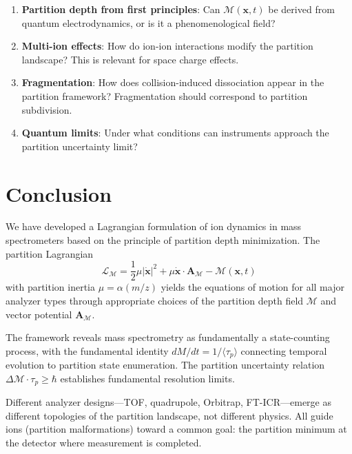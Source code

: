 \documentclass[twocolumn,10pt,a4paper]{article}
\theoremstyle{definition}
\theoremstyle{remark}
\newcommand{\Mdepth}{\mathcal{M}}
\newcommand{\Lagr}{\mathcal{L}}
\newcommand{\Apartition}{\mathbf{A}_{\mathcal{M}}}
\newcommand{\partinert}{\mu}
\newcommand{\taup}{\tau_p}
\begin{document}
\begin{enumerate}
    \item \textbf{Partition depth from first principles}: Can $\Mdepth(\mathbf{x}, t)$ be derived from quantum electrodynamics, or is it a phenomenological field?

    \item \textbf{Multi-ion effects}: How do ion-ion interactions modify the partition landscape? This is relevant for space charge effects.

    \item \textbf{Fragmentation}: How does collision-induced dissociation appear in the partition framework? Fragmentation should correspond to partition subdivision.

    \item \textbf{Quantum limits}: Under what conditions can instruments approach the partition uncertainty limit?
\end{enumerate}

\section{Conclusion}
\label{sec:conclusion}

We have developed a Lagrangian formulation of ion dynamics in mass spectrometers based on the principle of partition depth minimization. The partition Lagrangian
\begin{equation*}
    \Lagr_{\Mdepth} = \frac{1}{2}\partinert|\dot{\mathbf{x}}|^2 + \partinert\dot{\mathbf{x}}\cdot\Apartition - \Mdepth(\mathbf{x}, t)
\end{equation*}
with partition inertia $\partinert = \alpha(m/z)$ yields the equations of motion for all major analyzer types through appropriate choices of the partition depth field $\Mdepth$ and vector potential $\Apartition$.

The framework reveals mass spectrometry as fundamentally a state-counting process, with the fundamental identity $dM/dt = 1/\langle\taup\rangle$ connecting temporal evolution to partition state enumeration. The partition uncertainty relation $\Delta\Mdepth \cdot \taup \geq \hbar$ establishes fundamental resolution limits.

Different analyzer designs---TOF, quadrupole, Orbitrap, FT-ICR---emerge as different topologies of the partition landscape, not different physics. All guide ions (partition malformations) toward a common goal: the partition minimum at the detector where measurement is completed.
\end{document}
